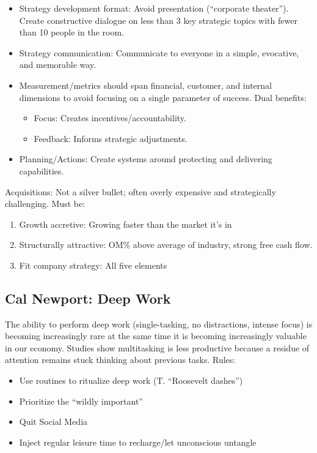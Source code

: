 \documentclass[
]{article}
\begin{document}
\begin{itemize}
  \begin{itemize}
  \item
    Strategy development format: Avoid presentation (``corporate
    theater''). Create constructive dialogue on less than 3 key
    strategic topics with fewer than 10 people in the room.
  \item
    Strategy communication: Communicate to everyone in a simple,
    evocative, and memorable way.
  \item
    Measurement/metrics should span financial, customer, and internal
    dimensions to avoid focusing on a single parameter of success. Dual
    benefits:

    \begin{itemize}
    \item
      Focus: Creates incentives/accountability.
    \item
      Feedback: Informs strategic adjustments.
    \end{itemize}
  \item
    Planning/Actions: Create systems around protecting and delivering
    capabilities.
  \end{itemize}
\end{itemize}

Acquisitions: Not a silver bullet; often overly expensive and
strategically challenging. Must be:

\begin{enumerate}
\def\labelenumi{\arabic{enumi}.}
\item
  Growth accretive: Growing faster than the market it's in
\item
  Structurally attractive: OM\% above average of industry, strong free
  cash flow.
\item
  Fit company strategy: All five elements
\end{enumerate}

\hypertarget{cal-newport-deep-work}{%
\subsection{Cal Newport: Deep Work}\label{cal-newport-deep-work}}

The ability to perform deep work (single-tasking, no distractions,
intense focus) is becoming increasingly rare at the same time it is
becoming increasingly valuable in our economy. Studies show multitasking
is less productive because a residue of attention remains stuck thinking
about previous tasks. Rules:

\begin{itemize}
\item
  Use routines to ritualize deep work (T. ``Roosevelt dashes'')
\item
  Prioritize the ``wildly important''
\item
  Quit Social Media
\item
  Inject regular leisure time to recharge/let unconscious untangle
\end{itemize}
\end{document}
